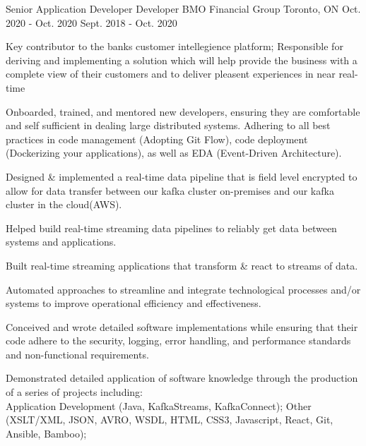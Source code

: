 \begin{cventries}
\cventry
{Senior Application Developer \newline Developer} %
{BMO Financial Group} %
{Toronto, ON} %
{Oct. 2020 - Oct. 2020 \newline Sept. 2018 - Oct. 2020} %
{ %
\begin{cvitems}
\item {Key contributor to the banks customer intellegience platform; Responsible for deriving and implementing a solution which will help provide the business with a complete view of their customers and to deliver pleasent experiences in near real-time} 
\item {Onboarded, trained, and mentored new developers, ensuring they are comfortable and self sufficient in dealing large distributed systems. Adhering to all best practices in code management (Adopting Git Flow), code deployment (Dockerizing your applications), as well as EDA (Event-Driven Architecture).}
\item {Designed \& implemented a real-time data pipeline that is field level encrypted to allow for data transfer between our kafka cluster on-premises and our kafka cluster in the cloud(AWS).}
\item {Helped build real-time streaming data pipelines to reliably get data between systems and applications.}
\item {Built real-time streaming applications that transform \& react to streams of data.}
\item {Automated approaches to streamline and integrate technological processes and/or systems to improve operational efficiency and effectiveness.}
\item {Conceived and wrote detailed software implementations while ensuring that their code adhere to the security, logging, error handling, and performance standards and non-functional requirements.}
\item {Demonstrated detailed application of software knowledge through the production of a series of projects including: \\Application Development (Java, KafkaStreams, KafkaConnect); Other (XSLT/XML, JSON, AVRO, WSDL, HTML, CSS3, Javascript, React, Git, Ansible, Bamboo);}
\end{cvitems}
}


\end{cventries}

